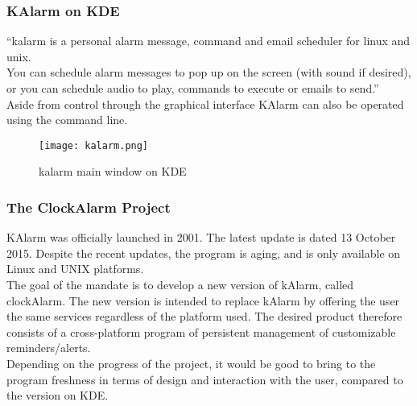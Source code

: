 \subsubsection{KAlarm on KDE}
``\gls{kalarm} is a personal alarm message, command and email scheduler for \gls{linux} and \gls{unix}. \\ You can schedule alarm messages to pop up on the screen (with sound if desired), or you can schedule audio to play, commands to execute or emails to send.'' \cite{kalarm_handbook} \\

Aside from control through the graphical interface KAlarm can also be operated using the command line.

\begin{figure}[h]
\centering
\caption{\gls{kalarm} main window on KDE}
\texttt{[image: kalarm.png]}
\end{figure}

\subsubsection{The ClockAlarm Project}
KAlarm was officially launched in 2001. The latest update is dated 13 October 2015. Despite the recent updates, the program is aging, and is only available on Linux and UNIX platforms.\\
The goal of the mandate is to develop a new version of kAlarm, called clockAlarm. The new version is intended to replace kAlarm by offering the user the same services regardless of the platform used. The desired product therefore consists of a cross-platform program of persistent management of customizable reminders/alerts.\\
Depending on the progress of the project, it would be good to bring to the program freshness in terms of design and interaction with the user, compared to the version on KDE.